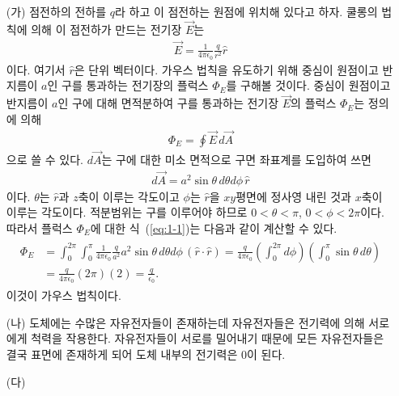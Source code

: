 \documentclass[tightenlines,floatfix,nofootinbib,superscriptaddress,fleqn]{revtex4-2}
\begin{document}
\begin{itemize}
  \item[(가)] 점전하의 전하를 $q$라 하고 이 점전하는 원점에 위치해 있다고 하자. 
  쿨롱의 법칙에 의해 이 점전하가 만드는 전기장 $\vec{E}$는
  \begin{align}
    \vec{E} = \frac{1}{4\pi\epsilon_0}\frac{q}{r^2}\hat{r}
  \end{align}
이다. 여기서 $\hat{r}$은 단위 벡터이다. 가우스 법칙을 유도하기 위해
중심이 원점이고 반지름이 $a$인 구를 통과하는 전기장의 플럭스 $\Phi_E$를 구해볼 것이다.
중심이 원점이고 반지름이 $a$인 구에 대해 면적분하여 구를 통과하는 전기장 $\vec{E}$의 
플럭스 $\Phi_E$는 정의에 의해 
\begin{align}\label{eq:1-1}
  \Phi_E=\oint \vec{E}\,d\vec{A}
\end{align}
으로 쓸 수 있다. $d\vec{A}$는 구에 대한 미소 면적으로 구면 좌표계를 도입하여 쓰면
\begin{align}
  d\vec{A} = a^2\sin\theta\,d\theta d\phi\,\hat{r}
\end{align}
이다. $\theta$는 $\hat{r}$과 $z$축이 이루는 각도이고 $\phi$는 $\hat{r}$을 $xy$평면에 정사영
내린 것과 $x$축이 이루는 각도이다. 적분범위는 구를 이루어야 하므로 $0<\theta<\pi$, 
$0<\phi<2\pi$이다. 따라서 플럭스 $\Phi_E$에 대한 식~(\ref{eq:1-1})는 다음과 같이
계산할 수 있다.
\begin{align}
  \begin{split}
    \Phi_E&=\int^{2\pi}_0\int^{\pi}_0 \frac{1}{4\pi\epsilon_0}\frac{q}{a^2}
    a^2\sin{\theta}\,d\theta d\phi\,(\hat{r}\cdot\hat{r})
    =\frac{q}{4\pi\epsilon_0}\left(\int^{2\pi}_0d\phi\right)
    \left(\int^{\pi}_0\sin{\theta}\,d\theta \right) \\
    &=\frac{q}{4\pi\epsilon_0}(2\pi)(2)=\frac{q}{\epsilon_0}.  
  \end{split}
\end{align}
이것이 가우스 법칙이다.
  \item[(나)] 도체에는 수많은 자유전자들이 존재하는데 자유전자들은 전기력에 의해 서로에게
  척력을 작용한다. 자유전자들이 서로를 밀어내기 때문에 모든 자유전자들은 결국 표면에 존재하게 되어
  도체 내부의 전기력은 $0$이 된다.
  \item[(다)] 
\begin{figure}[htbp]
  \centering
\end{figure}
\end{itemize}
\end{document}
